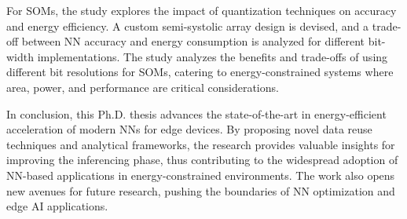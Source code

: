 For SOMs, the study explores the impact of quantization techniques on accuracy and energy efficiency. A custom semi-systolic array design is devised, and a trade-off between NN accuracy and energy consumption is analyzed for different bit-width implementations. The study analyzes the benefits and trade-offs of using different bit resolutions for SOMs, catering to energy-constrained systems where area, power, and performance are critical considerations.

In conclusion, this Ph.D. thesis advances the state-of-the-art in energy-efficient acceleration of modern NNs for edge devices. By proposing novel data reuse techniques and analytical frameworks, the research provides valuable insights for improving the inferencing phase, thus contributing to the widespread adoption of NN-based applications in energy-constrained environments. The work also opens new avenues for future research, pushing the boundaries of NN optimization and edge AI applications.